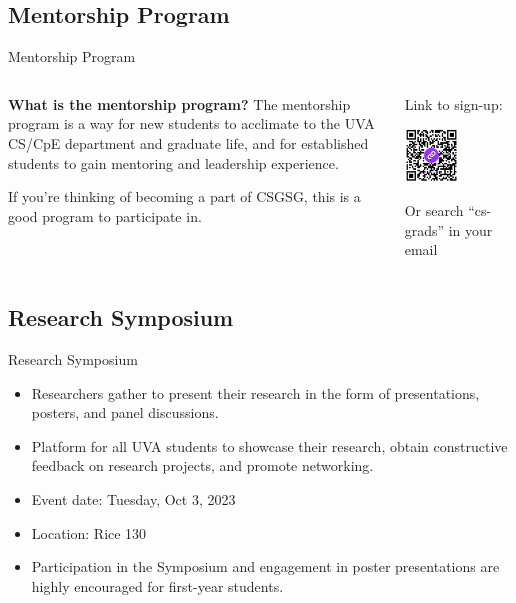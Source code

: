 \documentclass[aspectratio=169]{beamer}
\begin{document}
\subsection{Mentorship Program}
\begin{frame}{Mentorship Program}
\begin{columns}
\begin{column}{0.5\textwidth}
\textbf{What is the mentorship program?}
The mentorship program is a way for new students to acclimate to the UVA CS/CpE department and graduate life, and for established students to gain mentoring and leadership experience.

\vspace{0.33cm}

If you're thinking of becoming a part of CSGSG, this is a good program to participate in.
\end{column}
\begin{column}{0.5\textwidth}  %
    \begin{center}
    Link to sign-up:
    
     \includegraphics[width=0.5\textwidth]{mentor-program-fall2023.png}

     {Or search ``cs-grads'' in your email}
     \end{center}
\end{column}
\end{columns}
\end{frame}




% 

\subsection{Research Symposium}
\begin{frame}{Research Symposium}
\begin{itemize}
    \item Researchers gather to present their research in the form of presentations, posters, and panel discussions.
    \item Platform for all UVA students to showcase their research, obtain constructive feedback on research projects, and promote networking.
    \item Event date: Tuesday, Oct 3, 2023
    \item Location: Rice 130
    \item Participation in the Symposium and engagement in poster presentations are highly encouraged for first-year students.
\end{itemize}
\end{frame}
\end{document}
